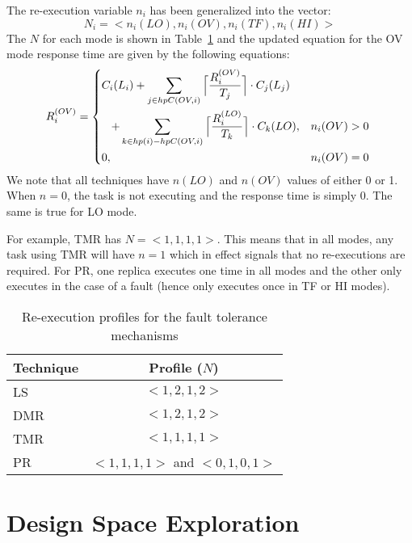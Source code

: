 	The re-execution variable $n_i$ has been generalized into the vector:
\begin{equation}
	N_i=<n_i(LO),n_i(OV),n_i(TF),n_i(HI)>
\end{equation} 
	The $N$ for each mode is shown in Table~\ref{t:reex} and the updated equation for the OV mode response time are given by the following equations:
	\begin{equation}
\begin{aligned}
R_i^{(OV)} =
\begin{dcases*}
C_i(L_i)\color{red} \color{black}+\sum_{j \in hpC(OV,i)}\Big\lceil\frac{R_i^{(OV)}}{T_j}\Big\rceil \cdot C_j(L_j) \\
\hspace{0.3cm} +\sum_{k \in hp(i)-hpC(OV,i)}\Big\lceil\frac{R_i^{(LO)}}{T_k}\Big\rceil \cdot C_k(LO), &  $n_i(OV)>0$ \\
	0, & $n_i(OV)=0$
\end{dcases*}
   \end{aligned}
\end{equation}
	We note that all techniques have $n(LO)$ and $n(OV)$ values of either 0 or 1. When $n=0$, the task is not executing and the response time is simply 0. The same is true for LO mode.
	
	For example, TMR has $N=<1,1,1,1>$. This means that in all modes, any task using TMR will have $n=1$ which in effect signals that no re-executions are required. For PR, one replica executes one time in all modes and the other only executes in the case of a fault (hence only executes once in TF or HI modes).

	\begin{table}
\caption{Re-execution profiles for the fault tolerance mechanisms}
\label{t:reex}
\centering
	\begin{tabular}{@{}l|c@{}}
	\toprule
	Technique & Profile ($N$) \\
	\bottomrule
	LS & $<1,2,1,2>$ \\
	DMR & $<1,2,1,2>$ \\
	TMR & $<1,1,1,1>$ \\
	PR & $<1,1,1,1>$ and $<0,1,0,1>$ \\
	\end{tabular}
\end{table} 	

\section{Design Space Exploration}

